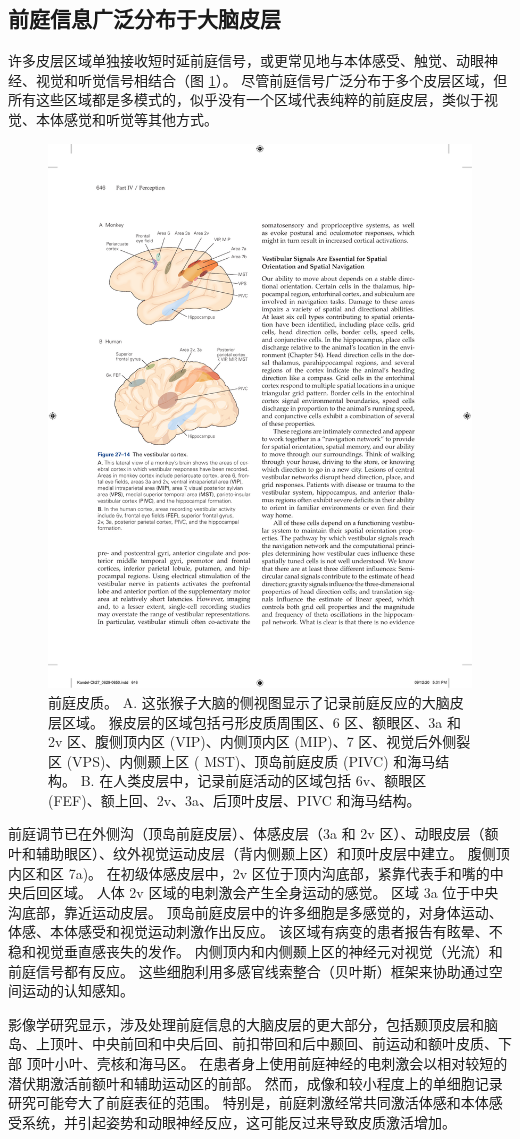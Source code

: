 \subsection{前庭信息广泛分布于大脑皮层}
许多皮层区域单独接收短时延前庭信号，或更常见地与本体感受、触觉、动眼神经、视觉和听觉信号相结合（图 \ref{fig:27_14}）。 
尽管前庭信号广泛分布于多个皮层区域，但所有这些区域都是多模式的，似乎没有一个区域代表纯粹的前庭皮层，类似于视觉、本体感觉和听觉等其他方式。


\begin{figure}[htbp]
	\centering
	\includegraphics[width=0.5\linewidth]{chap27/fig_27_14}
	\caption{前庭皮质。 A. 这张猴子大脑的侧视图显示了记录前庭反应的大脑皮层区域。 猴皮层的区域包括弓形皮质周围区、6 区、额眼区、3a 和 2v 区、腹侧顶内区 (VIP)、内侧顶内区 (MIP)、7 区、视觉后外侧裂区 (VPS)、内侧颞上区 ( MST)、顶岛前庭皮质 (PIVC) 和海马结构。 B. 在人类皮层中，记录前庭活动的区域包括 6v、额眼区 (FEF)、额上回、2v、3a、后顶叶皮层、PIVC 和海马结构。}
	\label{fig:27_14}
\end{figure}


前庭调节已在外侧沟（顶岛前庭皮层）、体感皮层（3a 和 2v 区）、动眼皮层（额叶和辅助眼区）、纹外视觉运动皮层（背内侧颞上区）和顶叶皮层中建立。 腹侧顶内区和区 7a)。 在初级体感皮层中，2v 区位于顶内沟底部，紧靠代表手和嘴的中央后回区域。 人体 2v 区域的电刺激会产生全身运动的感觉。 区域 3a 位于中央沟底部，靠近运动皮层。 顶岛前庭皮层中的许多细胞是多感觉的，对身体运动、体感、本体感受和视觉运动刺激作出反应。 该区域有病变的患者报告有眩晕、不稳和视觉垂直感丧失的发作。 内侧顶内和内侧颞上区的神经元对视觉（光流）和前庭信号都有反应。 这些细胞利用多感官线索整合（贝叶斯）框架来协助通过空间运动的认知感知。

影像学研究显示，涉及处理前庭信息的大脑皮层的更大部分，包括颞顶皮层和脑岛、上顶叶、中央前回和中央后回、前扣带回和后中颞回、前运动和额叶皮质、下部 顶叶小叶、壳核和海马区。 在患者身上使用前庭神经的电刺激会以相对较短的潜伏期激活前额叶和辅助运动区的前部。 然而，成像和较小程度上的单细胞记录研究可能夸大了前庭表征的范围。 特别是，前庭刺激经常共同激活体感和本体感受系统，并引起姿势和动眼神经反应，这可能反过来导致皮质激活增加。

